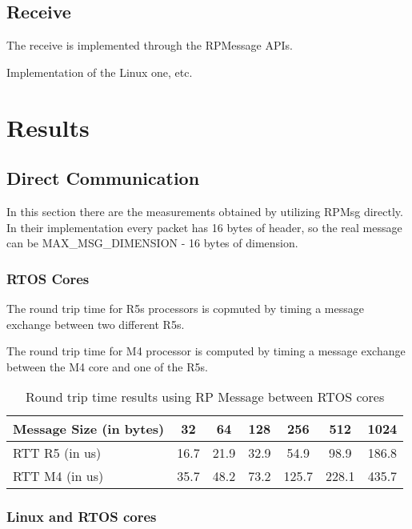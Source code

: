 \subsection{Receive}

The receive is implemented through the RPMessage APIs.

Implementation of the Linux one, etc.

\section{Results}

\subsection{Direct Communication}

In this section there are the measurements obtained by utilizing RPMsg
directly.
In their implementation every packet has 16 bytes of header, so the real
message can be MAX\_MSG\_DIMENSION - 16 bytes of dimension.

\subsubsection{RTOS Cores}

The round trip time for R5s processors is copmuted by timing a message exchange
between two different R5s.

The round trip time for M4 processor is computed by timing a message exchange
between the M4 core and one of the R5s.

\begin{table}
\centering
\caption{Round trip time results using RP Message between RTOS cores}
\label{table:direct_communication_RTOS_cores}
\begin{tabular}{lcccccc}
\toprule
Message Size (in bytes) & 32 & 64 & 128 & 256 & 512 & 1024 \\
\midrule
RTT R5 (in us) & 16.7 & 21.9 & 32.9 & 54.9 & 98.9 & 186.8 \\
RTT M4 (in us) & 35.7 & 48.2 & 73.2 & 125.7 & 228.1 & 435.7 \\
\bottomrule
\end{tabular}
\end{table}

\subsubsection{Linux and RTOS cores}

